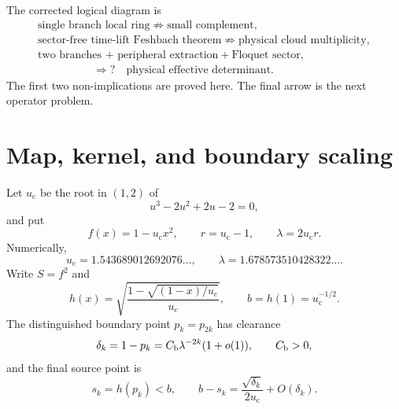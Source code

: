 \documentclass[11pt]{article}
\theoremstyle{definition}
\theoremstyle{remark}
\newcommand{\uc}{u_{\mathrm c}}
\begin{document}
The corrected logical diagram is
\begin{equation}\label{eq:corrected-diagram}
 \boxed{
 \begin{gathered}
 \text{single branch local ring}
 \not\Longrightarrow
 \text{small complement},\\
 \text{sector-free time-lift Feshbach theorem}
 \not\Longrightarrow
 \text{physical cloud multiplicity},\\
 \text{two branches + peripheral extraction}
 +\text{Floquet sector},\\[-0.2em]
 \hspace{5em}\Longrightarrow?\quad
 \text{physical effective determinant}.
 \end{gathered}}
\end{equation}
The first two non-implications are proved here.  The final arrow is the next
operator problem.

\section{Map, kernel, and boundary scaling}
\label{sec:setup}

Let $\uc$ be the root in $(1,2)$ of
\begin{equation}\label{eq:cubic}
 u^3-2u^2+2u-2=0,
\end{equation}
and put
\begin{equation}\label{eq:constants}
 f(x)=1-\uc x^2,
 \qquad r=\uc-1,
 \qquad \lambda=2\uc r.
\end{equation}
Numerically,
\begin{equation}\label{eq:constant-values}
 \uc=1.543689012692076\ldots,
 \qquad
 \lambda=1.678573510428322\ldots.
\end{equation}
Write $S=f^2$ and
\begin{equation}\label{eq:inverse-h}
 h(x)=\sqrt{\frac{1-\sqrt{(1-x)/\uc}}{\uc}},
 \qquad b=h(1)=\uc^{-1/2}.
\end{equation}
The distinguished boundary point $p_k=p_{2k}$ has clearance
\begin{equation}\label{eq:clearance-law}
 \delta_k=1-p_k=C_{\rm b}\lambda^{-2k}(1+o(1)),
 \qquad C_{\rm b}>0,
\end{equation}
and the final source point is
\begin{equation}\label{eq:final-source}
 s_k=h(p_k)<b,
 \qquad
 b-s_k=\frac{\sqrt{\delta_k}}{2\uc}+O(\delta_k).
\end{equation}
\end{document}
